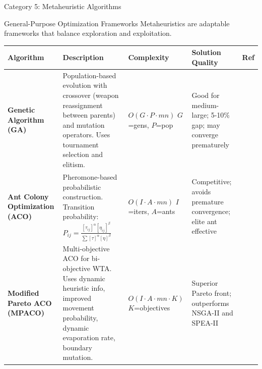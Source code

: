 \documentclass[aspectratio=43,8pt]{beamer}
\begin{document}
\begin{frame}{Category 5: Metaheuristic Algorithms}
\begin{block}{General-Purpose Optimization Frameworks}
Metaheuristics are adaptable frameworks that balance exploration and exploitation.
\end{block}

\vspace{0.2cm}
\begin{table}[h]
\centering
\small
\begin{tabular}{p{1.6cm}p{3.5cm}p{1.6cm}p{1.7cm}p{0.9cm}}
\toprule
\textbf{Algorithm} & \textbf{Description} & \textbf{Complexity} & \textbf{Solution Quality} & \textbf{Ref} \\
\midrule
\textbf{Genetic Algorithm (GA)} & Population-based evolution with crossover (weapon reassignment between parents) and mutation operators. Uses tournament selection and elitism. & $O(G \cdot P \cdot mn)$ $G$=gens, $P$=pop & Good for medium-large; 5-10\% gap; may converge prematurely & \cite{lee2003,bogdanowicz2013} \\
\addlinespace
\textbf{Ant Colony Optimization (ACO)} & Pheromone-based probabilistic construction. Transition probability: $P_{ij} = \frac{[\tau_{ij}]^\alpha [\eta_{ij}]^\beta}{\sum [\tau]^\alpha [\eta]^\beta}$ & $O(I \cdot A \cdot mn)$ $I$=iters, $A$=ants & Competitive; avoids premature convergence; elite ant effective & \cite{lee2002,hu2018} \\
\addlinespace
\textbf{Modified Pareto ACO (MPACO)} & Multi-objective ACO for bi-objective WTA. Uses dynamic heuristic info, improved movement probability, dynamic evaporation rate, boundary mutation. & $O(I \cdot A \cdot mn \cdot K)$ $K$=objectives & Superior Pareto front; outperforms NSGA-II and SPEA-II & \cite{li2017} \\
\bottomrule
\end{tabular}
\end{table}

\end{frame}
\end{document}
